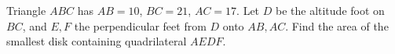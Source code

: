 Triangle $ABC$ has $AB=10$, $BC=21$, $AC=17$. Let $D$ be the altitude foot on $BC$, and $E,F$ the perpendicular feet from $D$ onto $AB,AC$. Find the area of the smallest disk containing quadrilateral $AEDF$.
